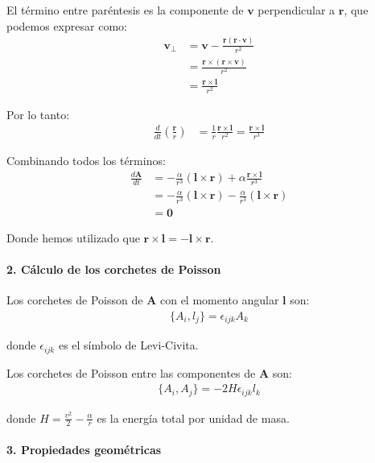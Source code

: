 \documentclass[12pt]{article}
\begin{document}
\begin{enumerate}
  El término entre paréntesis es la componente de $\mathbf{v}$ perpendicular a $\mathbf{r}$, que podemos expresar como:
  \begin{align}
  \mathbf{v}_{\perp} &= \mathbf{v} - \frac{\mathbf{r}(\mathbf{r}\cdot\mathbf{v})}{r^2} \\
  &= \frac{\mathbf{r}\times(\mathbf{r}\times\mathbf{v})}{r^2} \\
  &= \frac{\mathbf{r}\times\mathbf{l}}{r^2}
  \end{align}

  Por lo tanto:
  \begin{align}
  \frac{d}{dt}\left(\frac{\mathbf{r}}{r}\right) &= \frac{1}{r}\frac{\mathbf{r}\times\mathbf{l}}{r^2} = \frac{\mathbf{r}\times\mathbf{l}}{r^3}
  \end{align}

  Combinando todos los términos:
  \begin{align}
  \frac{d\mathbf{A}}{dt} &= -\frac{\alpha}{r^3}(\mathbf{l} \times \mathbf{r}) + \alpha\frac{\mathbf{r}\times\mathbf{l}}{r^3} \\
  &= -\frac{\alpha}{r^3}(\mathbf{l} \times \mathbf{r}) - \frac{\alpha}{r^3}(\mathbf{l} \times \mathbf{r}) \\
  &= \mathbf{0}
  \end{align}

  Donde hemos utilizado que $\mathbf{r}\times\mathbf{l} = -\mathbf{l}\times\mathbf{r}$.

  \paragraph{2. Cálculo de los corchetes de Poisson}

  Los corchetes de Poisson de $\mathbf{A}$ con el momento angular $\mathbf{l}$ son:
  \begin{align}
  \{A_i, l_j\} = \epsilon_{ijk}A_k
  \end{align}

  donde $\epsilon_{ijk}$ es el símbolo de Levi-Civita.

  Los corchetes de Poisson entre las componentes de $\mathbf{A}$ son:
  \begin{align}
  \{A_i, A_j\} = -2H\epsilon_{ijk}l_k
  \end{align}

  donde $H = \frac{v^2}{2} - \frac{\alpha}{r}$ es la energía total por unidad de masa.

  \paragraph{3. Propiedades geométricas}


\end{enumerate}
\end{document}
